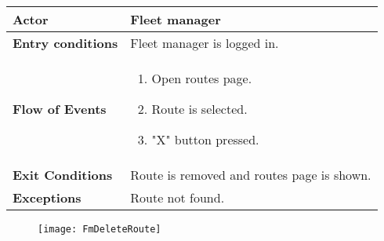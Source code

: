 \begin{itemize}
\begin{table}[H]
\begin{tabular}{| m{3.5cm} | m{9.5cm} |}
		\hline
		\textbf{Actor} & Fleet manager\\
		\hline
		\textbf{Entry conditions} & Fleet manager is logged in.\\
		\hline
		\textbf{Flow of Events} & 
		\begin{enumerate}
			\item Open routes page.
			\item Route is selected. 
			\item "X" button pressed.
		\end{enumerate}\\
	\hline
\textbf{Exit Conditions} & Route is removed and routes page is shown.\\
\hline
\textbf{Exceptions} & Route not found.\\
\hline
	\end{tabular}
\end{table}
\begin{figure}[H]
	\centering
	\texttt{[image: FmDeleteRoute]}
\end{figure}
\end{itemize}
